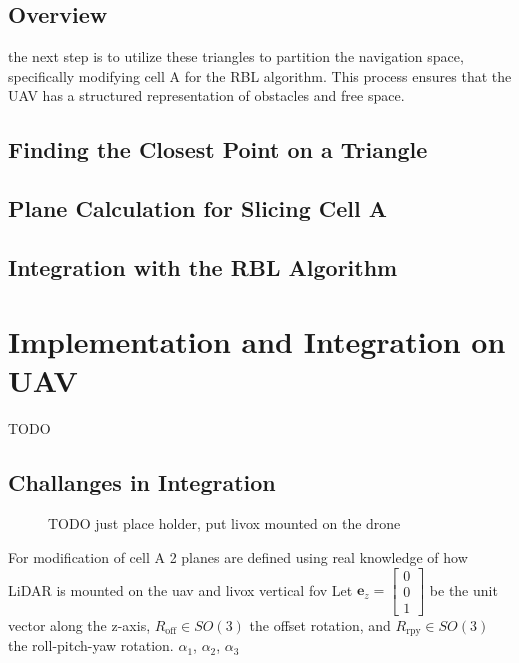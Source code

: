         \subsection{Overview}
        the next step is to utilize these triangles to partition the navigation space, specifically modifying cell 
        A for the RBL algorithm. This process ensures that the UAV has a structured representation of obstacles and free space.
        \subsection{Finding the Closest Point on a Triangle}
        \subsection{Plane Calculation for Slicing Cell A}
        \subsection{Integration with the RBL Algorithm}

    \section{Implementation and Integration on UAV}
        TODO
        \subsection{Challanges in Integration}
            \begin{figure}[htbp]
                \centering
                \caption{
                    TODO just place holder, put livox mounted on the drone
                }
                \label{fig:uavs}
          \end{figure}

            For modification of cell A 2 planes are defined using real knowledge of how LiDAR is mounted on the uav and livox vertical fov
            Let $\mathbf{e}_z = \begin{bmatrix} 0 \\ 0 \\ 1 \end{bmatrix}$ be the unit vector along the z-axis,  
            $R_{\text{off}} \in SO(3)$ the offset rotation, and  
            $R_{\text{rpy}} \in SO(3)$ the roll-pitch-yaw rotation. 
            $\alpha_1$, $\alpha_2$, $\alpha_3$

